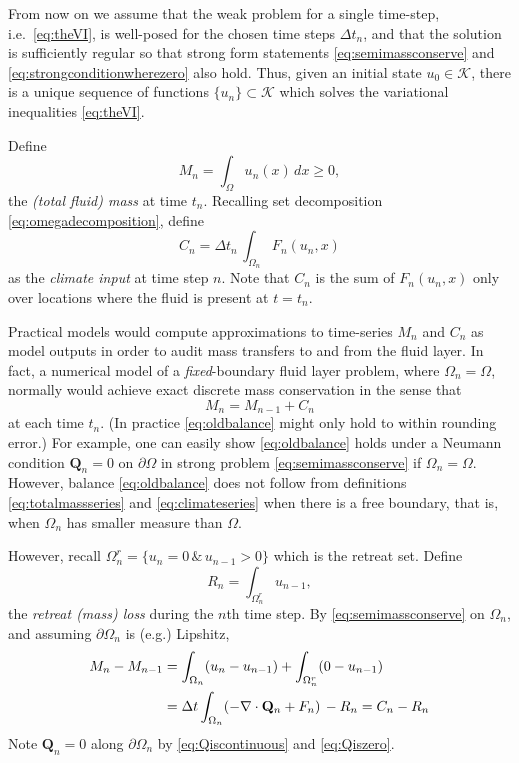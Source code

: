 \documentclass[final,onefignum]{siamart190516}
\newcommand\bQ{\mathbf{Q}}
\newcommand{\Div}{\nabla\cdot}
\begin{document}
From now on we assume that the weak problem for a single time-step, i.e.~\eqref{eq:theVI}, is well-posed for the chosen time steps $\Delta t_n$, and that the solution is sufficiently regular so that strong form statements \eqref{eq:semimassconserve} and \eqref{eq:strongconditionwherezero} also hold.  Thus, given an initial state $u_0\in\mathcal{K}$, there is a unique sequence of functions $\{u_n\} \subset \mathcal{K}$ which solves the variational inequalities \eqref{eq:theVI}.

Define
\begin{equation}
M_n = \int_\Omega u_n(x)\,dx \ge 0, \label{eq:totalmassseries}
\end{equation}
the \emph{(total fluid) mass} at time $t_n$.  Recalling set decomposition \eqref{eq:omegadecomposition}, define
\begin{equation}
C_n = \Delta t_n\, \int_{\Omega_n} F_n(u_n,x) \label{eq:climateseries}
\end{equation}
as the \emph{climate input} at time step $n$.  Note that $C_n$ is the sum of $F_n(u_n,x)$ only over locations where the fluid is present at $t=t_n$.

Practical models would compute approximations to time-series $M_n$ and $C_n$ as model outputs in order to audit mass transfers to and from the fluid layer.  In fact, a numerical model of a \emph{fixed}-boundary fluid layer problem, where $\Omega_n=\Omega$, normally would achieve exact discrete mass conservation in the sense that
\begin{equation}
M_n = M_{n-1} + C_n \label{eq:oldbalance}
\end{equation}
at each time $t_n$.  (In practice \eqref{eq:oldbalance} might only hold to within rounding error.)  For example, one can easily show \eqref{eq:oldbalance} holds under a Neumann condition $\bQ_n=0$ on $\partial \Omega$ in strong problem \eqref{eq:semimassconserve} if $\Omega_n=\Omega$.  However, balance \eqref{eq:oldbalance} does not follow from definitions \eqref{eq:totalmassseries} and \eqref{eq:climateseries} when there is a free boundary, that is, when $\Omega_n$ has smaller measure than $\Omega$.

However, recall $\Omega_n^r=\{u_n = 0 \,\&\,u_{n-1}>0\}$ which is the retreat set.  Define
\begin{equation}
R_n = \int_{\Omega_n^r} u_{n-1}, \label{eq:retreatlossseries}
\end{equation}
the \emph{retreat (mass) loss} during the $n$th time step.  By \eqref{eq:semimassconserve} on $\Omega_n$, and assuming $\partial \Omega_n$ is (e.g.) Lipshitz,
\begin{align}
M_n - M_{n-1} &= \int_{\Omega_n} (u_n - u_{n-1}) + \int_{\Omega_n^r} (0 - u_{n-1}) \label{eq:newbalance} \\
   &= \Delta t \int_{\Omega_n} (- \Div \bQ_n + F_n) \, - R_n = C_n - R_n \notag
\end{align}
Note $\bQ_n=0$ along $\partial \Omega_n$ by \eqref{eq:Qiscontinuous} and \eqref{eq:Qiszero}.
\end{document}

